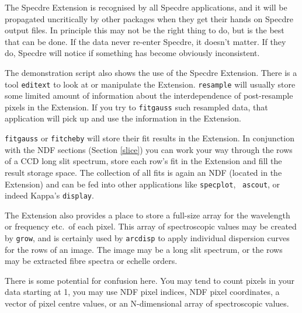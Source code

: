 The Specdre Extension is recognised by all Specdre applications, and it
will be propagated uncritically by other packages when they get their
hands on Specdre output files. In principle this may not be the right
thing to do, but is the best that can be done. If the data never
re-enter Specdre, it doesn't matter. If they do, Specdre will notice if
something has become obviously inconsistent.

The demonstration script also shows the use of the Specdre Extension. There is
a tool {\tt editext} to look at or manipulate the Extension. {\tt resample}
will usually store some limited amount of information about the interdependence
of post-resample pixels in the Extension. If you try to {\tt fitgauss} such
resampled data, that application will pick up and use the information in the
Extension.

{\tt fitgauss} or {\tt fitcheby} will store their fit results in the
Extension. In conjunction with the NDF sections (Section \ref{slice})
you can work your way through the rows of a CCD long slit spectrum,
store each row's fit in the Extension and fill the result storage space.
The collection of all fits is again an NDF (located in the Extension)
and can be fed into other applications like {\tt specplot}, {\tt
ascout}, or indeed Kappa's {\tt display}.

The Extension also provides a place to store a full-size array for the
wavelength or frequency etc.\ of each pixel.  This array of
spectroscopic values may be created by {\tt grow}, and is certainly used
by {\tt arcdisp} to apply individual dispersion curves for the rows of
an image.  The image may be a long slit spectrum, or the rows may be
extracted fibre spectra or echelle orders.

There is some potential for confusion here.  You may tend to count
pixels in your data starting at 1, you may use NDF pixel indices, NDF
pixel coordinates, a vector of pixel centre values, or an N-dimensional
array of spectroscopic values.

